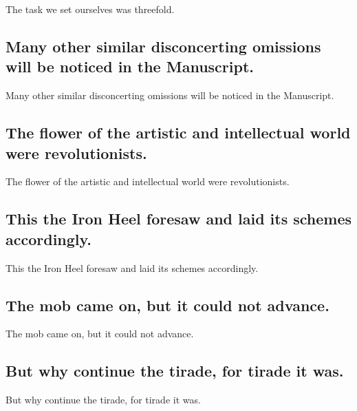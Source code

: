 \documentclass[]{article}
\begin{document}
The task we set ourselves was threefold.

\hypertarget{many-other-similar-disconcerting-omissions-will-be-noticed-in-the-manuscript.}{%
\subsection{Many other similar disconcerting omissions will be noticed
in the
Manuscript.}\label{many-other-similar-disconcerting-omissions-will-be-noticed-in-the-manuscript.}}

Many other similar disconcerting omissions will be noticed in the
Manuscript.

\hypertarget{the-flower-of-the-artistic-and-intellectual-world-were-revolutionists.}{%
\subsection{The flower of the artistic and intellectual world were
revolutionists.}\label{the-flower-of-the-artistic-and-intellectual-world-were-revolutionists.}}

The flower of the artistic and intellectual world were revolutionists.

\hypertarget{this-the-iron-heel-foresaw-and-laid-its-schemes-accordingly.}{%
\subsection{This the Iron Heel foresaw and laid its schemes
accordingly.}\label{this-the-iron-heel-foresaw-and-laid-its-schemes-accordingly.}}

This the Iron Heel foresaw and laid its schemes accordingly.

\hypertarget{the-mob-came-on-but-it-could-not-advance.}{%
\subsection{The mob came on, but it could not
advance.}\label{the-mob-came-on-but-it-could-not-advance.}}

The mob came on, but it could not advance.

\hypertarget{but-why-continue-the-tirade-for-tirade-it-was.}{%
\subsection{But why continue the tirade, for tirade it
was.}\label{but-why-continue-the-tirade-for-tirade-it-was.}}

But why continue the tirade, for tirade it was.
\end{document}
